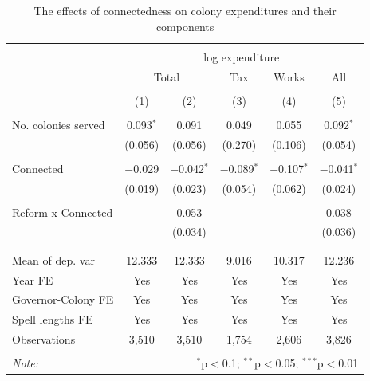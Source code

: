 \documentclass[a4paper]{article}\usepackage[]{graphicx}\usepackage[]{color}
\begin{document}
\begin{table}[!htbp] \centering 
  \caption{The effects of connectedness on colony expenditures and their components} 
  \label{tab:exp} 
\scriptsize 
\begin{tabular}{@{\extracolsep{5pt}}lccccc} 
\\[-1.8ex]\hline 
\hline \\[-1.8ex] 
 & \multicolumn{5}{c}{log expenditure} \\ 
\cline{2-6} 
 & \multicolumn{2}{c}{Total} & Tax & Works & All \\ 
\\[-1.8ex] & (1) & (2) & (3) & (4) & (5)\\ 
\hline \\[-1.8ex] 
 No. colonies served & 0.093$^{*}$ & 0.091 & 0.049 & 0.055 & 0.092$^{*}$ \\ 
  & (0.056) & (0.056) & (0.270) & (0.106) & (0.054) \\ 
  & & & & & \\ 
 Connected & $-$0.029 & $-$0.042$^{*}$ & $-$0.089$^{*}$ & $-$0.107$^{*}$ & $-$0.041$^{*}$ \\ 
  & (0.019) & (0.023) & (0.054) & (0.062) & (0.024) \\ 
  & & & & & \\ 
 Reform x Connected &  & 0.053 &  &  & 0.038 \\ 
  &  & (0.034) &  &  & (0.036) \\ 
  & & & & & \\ 
\hline \\[-1.8ex] 
Mean of dep. var & 12.333 & 12.333 & 9.016 & 10.317 & 12.236 \\ 
Year FE & Yes & Yes & Yes & Yes & Yes \\ 
Governor-Colony FE & Yes & Yes & Yes & Yes & Yes \\ 
Spell lengths FE & Yes & Yes & Yes & Yes & Yes \\ 
Observations & 3,510 & 3,510 & 1,754 & 2,606 & 3,826 \\ 
\hline 
\hline \\[-1.8ex] 
\textit{Note:}  & \multicolumn{5}{r}{$^{*}$p$<$0.1; $^{**}$p$<$0.05; $^{***}$p$<$0.01} \\ 
\end{tabular} 
\end{table} 
\end{document}
